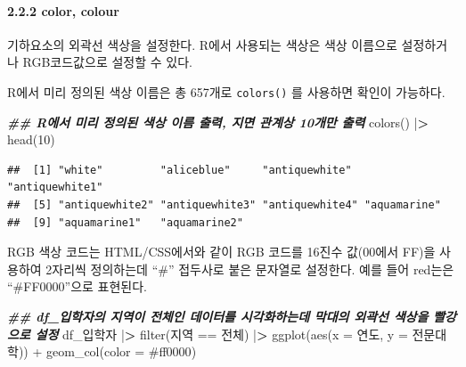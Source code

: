 \documentclass[
]{article}
\newenvironment{Shaded}{\begin{snugshade}}{\end{snugshade}}
\newcommand{\AttributeTok}[1]{\textcolor[rgb]{0.77,0.63,0.00}{#1}}
\newcommand{\DecValTok}[1]{\textcolor[rgb]{0.00,0.00,0.81}{#1}}
\newcommand{\DocumentationTok}[1]{\textcolor[rgb]{0.56,0.35,0.01}{\textbf{\textit{#1}}}}
\newcommand{\ErrorTok}[1]{\textcolor[rgb]{0.64,0.00,0.00}{\textbf{#1}}}
\newcommand{\FunctionTok}[1]{\textcolor[rgb]{0.00,0.00,0.00}{#1}}
\newcommand{\NormalTok}[1]{#1}
\newcommand{\SpecialCharTok}[1]{\textcolor[rgb]{0.00,0.00,0.00}{#1}}
\newcommand{\StringTok}[1]{\textcolor[rgb]{0.31,0.60,0.02}{#1}}
\begin{document}
\hypertarget{color-colour}{%
\paragraph{2.2.2 color, colour}\label{color-colour}}

기하요소의 외곽선 색상을 설정한다. R에서 사용되는 색상은 색상 이름으로 설정하거나 RGB코드값으로 설정할 수 있다.

R에서 미리 정의된 색상 이름은 총 657개로 \texttt{colors()} 를 사용하면 확인이 가능하다.

\begin{Shaded}
\begin{Highlighting}[]
\DocumentationTok{\#\# R에서 미리 정의된 색상 이름 출력, 지면 관계상 10개만 출력}
\FunctionTok{colors}\NormalTok{() }\SpecialCharTok{|}\ErrorTok{\textgreater{}} \FunctionTok{head}\NormalTok{(}\DecValTok{10}\NormalTok{)}
\end{Highlighting}
\end{Shaded}

\begin{verbatim}
##  [1] "white"         "aliceblue"     "antiquewhite"  "antiquewhite1"
##  [5] "antiquewhite2" "antiquewhite3" "antiquewhite4" "aquamarine"   
##  [9] "aquamarine1"   "aquamarine2"
\end{verbatim}

RGB 색상 코드는 HTML/CSS에서와 같이 RGB 코드를 16진수 값(00에서 FF)을 사용하여 2자리씩 정의하는데 ``\#'' 접두사로 붙은 문자열로 설정한다. 예를 들어 red는은 ``\#FF0000''으로 표현된다.

\begin{Shaded}
\begin{Highlighting}[]
\DocumentationTok{\#\# df\_입학자의 지역이 \textquotesingle{}전체\textquotesingle{}인 데이터를 시각화하는데 막대의 외곽선 색상을 빨강으로 설정}
\NormalTok{df\_입학자 }\SpecialCharTok{|}\ErrorTok{\textgreater{}} \FunctionTok{filter}\NormalTok{(지역 }\SpecialCharTok{==} \StringTok{\textquotesingle{}전체\textquotesingle{}}\NormalTok{) }\SpecialCharTok{|}\ErrorTok{\textgreater{}}
  \FunctionTok{ggplot}\NormalTok{(}\FunctionTok{aes}\NormalTok{(}\AttributeTok{x =}\NormalTok{ 연도, }\AttributeTok{y =}\NormalTok{ 전문대학)) }\SpecialCharTok{+}
  \FunctionTok{geom\_col}\NormalTok{(}\AttributeTok{color =} \StringTok{\textquotesingle{}\#ff0000\textquotesingle{}}\NormalTok{)}
\end{Highlighting}
\end{Shaded}
\end{document}
